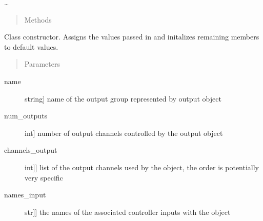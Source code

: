 \documentclass[letterpaper,10pt,english]{sphinxmanual}
\begin{document}
\begin{fulllineitems}
\sphinxAtStartPar
…
\begin{quote}\begin{description}
\item[{Methods}] \leavevmode
\end{description}\end{quote}

\begin{fulllineitems}
\label{\detokenize{specific:EarOutput.EarOutput.__init__}}
\sphinxAtStartPar
Class constructor. Assigns the values passed in and initalizes remaining members to default values.
\begin{quote}\begin{description}
\item[{Parameters}] \leavevmode
\end{description}\end{quote}
\begin{description}
\item[{name}] \leavevmode{[}string{]}
\sphinxAtStartPar
name of the output group represented by output object

\item[{num\_outputs}] \leavevmode{[}int{]}
\sphinxAtStartPar
number of output channels controlled by the output object

\item[{channels\_output}] \leavevmode{[}{[}int{]}{]}
\sphinxAtStartPar
list of the output channels used by the object, the order is potentially very specific

\item[{names\_input}] \leavevmode{[}{[}str{]}{]}
\sphinxAtStartPar
the names of the associated controller inputs with the object

\end{description}

\end{fulllineitems}


\begin{fulllineitems}
\label{\detokenize{specific:EarOutput.EarOutput.get_default_outputs}}~\begin{quote}


\end{quote}
\end{fulllineitems}
\end{fulllineitems}
\end{document}
